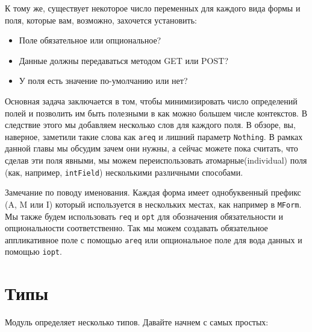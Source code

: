 К тому же, существует некоторое число переменных для каждого вида формы и поля,
которые вам, возможно, захочется установить:
\begin{itemize}
\item Поле обязательное или опциональное?
\item Данные должны передаваться методом GET или POST?
\item У поля есть значение по-умолчанию или нет?
\end{itemize}

Основная задача заключается в том, чтобы минимизировать число определений полей и
позволить
им быть полезными в как можно большем числе контекстов. В следствие этого мы добавляем
несколько слов для каждого поля. В обзоре, вы, наверное, заметили такие слова как
\lstinline'areq' и лишний параметр \lstinline'Nothing'. В рамках данной главы мы обсудим 
зачем они нужны, а сейчас можете пока считать, что сделав эти поля явными, мы можем
переиспользовать атомарные(individual) поля (как, например, 
{\lstinline'intField'}) несколькими различными способами.

Замечание по поводу именования. Каждая форма имеет однобуквенный префикс (A, M или I)
который используется в нескольких местах, как например в \lstinline'MForm'. Мы также
будем использовать \lstinline'req' и \lstinline'opt' для обозначения обязательности и
опциональности соответственно. Так мы можем создавать обязательное аппликативное поле с
помощью \lstinline'areq' или опциональное поле для вода данных и помощью \lstinline'iopt'.

\section{Типы}

Модуль  
определяет несколько типов. Давайте начнем с самых простых:

